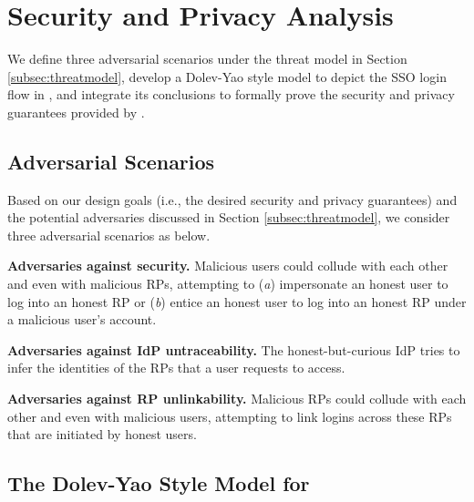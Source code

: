 \section{Security and Privacy Analysis}
\label{sec:analysis}
We define three adversarial scenarios under the threat model in Section \ref{subsec:threatmodel}, develop a Dolev-Yao style model \cite{BrowserID} to depict the SSO login flow in \usso, and integrate its conclusions to formally prove the security and privacy guarantees provided by \usso.


\newc
\subsection{Adversarial Scenarios}

Based on our design goals (i.e., the desired security and privacy guarantees) and the potential adversaries discussed in Section \ref{subsec:threatmodel}, we consider three adversarial scenarios as below.

\noindent\textbf{Adversaries against security.} Malicious users could collude with each other and even with malicious RPs, attempting to (\emph{a}) impersonate an honest user to log into an honest RP or (\emph{b}) entice an honest user to log into an honest RP under a malicious user's account.

\noindent\textbf{Adversaries against IdP untraceability.}
The honest-but-curious IdP tries to infer the identities of the RPs that a user requests to access. %

\noindent\textbf{Adversaries against RP unlinkability.}
Malicious RPs could collude with each other and even with malicious users, attempting to link logins across these RPs that are initiated by honest users. \oldc


\subsection{The Dolev-Yao Style Model for \usso}
\label{dy-model}

